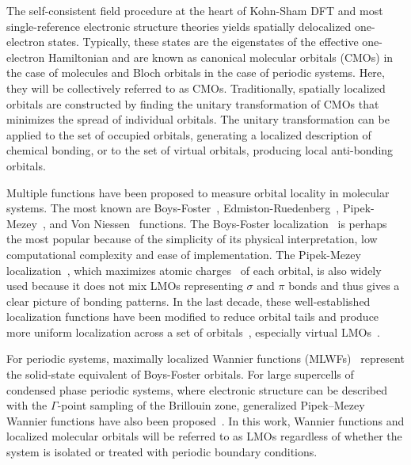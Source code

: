 \documentclass[aps,prl,reprint,amsmath,amssymb]{revtex4-1}
\begin{document}
The self-consistent field procedure at the heart of Kohn-Sham DFT and most single-reference electronic structure theories yields spatially delocalized one-electron states. Typically, these states are the eigenstates of the effective one-electron Hamiltonian and are known as canonical molecular orbitals (CMOs) in the case of molecules and Bloch orbitals in the case of periodic systems. Here, they will be collectively referred to as CMOs. 
Traditionally, spatially localized orbitals are constructed by finding the unitary transformation of CMOs that minimizes the spread of individual orbitals. 
The unitary transformation can be applied to the set of occupied orbitals, generating a localized description of chemical bonding, or to the set of virtual orbitals, producing local anti-bonding orbitals. 

Multiple functions have been proposed to measure orbital locality in molecular systems. The most known are Boys-Foster~\cite{boys1960construction}, Edmiston-Ruedenberg~\cite{bytautas2002electron, bytautas2003split, edmiston1963localized}, Pipek-Mezey~\cite{pipek1989fast}, and Von Niessen~\cite{niessen1972density} functions. 
The Boys-Foster localization~\cite{boys1960construction} is perhaps the most popular because of the simplicity of its physical interpretation, low computational complexity and ease of implementation. 
The Pipek-Mezey localization~\cite{pipek1989fast}, which maximizes atomic charges~\cite{mulliken1955electronic, lowdin1950non, lehtola2014pipek} of each orbital, is also widely used because it does not mix LMOs representing $\sigma$ and $\pi$ bonds and thus gives a clear picture of bonding patterns. 
In the last decade, these well-established localization functions have been modified to reduce orbital tails and produce more uniform localization across a set of orbitals~\cite{jansik2011local, hoyvik2012orbital, hoyvik2012trust, hoyvik2013pipek, lehtola2013unitary, lehtola2014pipek}, especially virtual LMOs~\cite{jansik2011local, hoyvik2012orbital}.

For periodic systems, maximally localized Wannier functions (MLWFs)~\cite{marzari2012maximally,marzari1997maximally} represent the solid-state equivalent of Boys-Foster orbitals. 
For large supercells of condensed phase periodic systems, where electronic structure can be described with the $\Gamma$-point sampling of the Brillouin zone, generalized Pipek–Mezey Wannier functions have also been proposed~\cite{jonsson2017theory}. 
In this work, Wannier functions and localized molecular orbitals will be referred to as LMOs regardless of whether the system is isolated or treated with periodic boundary conditions.
 
\end{document}
